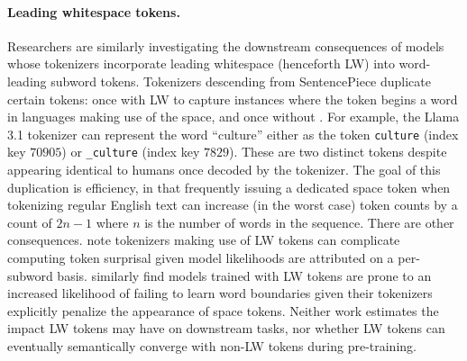 \paragraph{Leading whitespace tokens.}
Researchers are similarly investigating the downstream consequences of models whose tokenizers incorporate leading whitespace (henceforth LW) into word-leading subword tokens.
Tokenizers descending from SentencePiece duplicate certain tokens: once with LW to capture instances where the token begins a word in languages making use of the space, and once without \citep{Kudo_Richardson_2018}.
For example, the Llama 3.1 tokenizer can represent the word ``culture'' either as the token \verb.culture. (index key $70905$) or \verb._culture. (index key $7829$).
These are two distinct tokens despite appearing identical to humans once decoded by the tokenizer.
The goal of this duplication is efficiency, in that frequently issuing a dedicated space token when tokenizing regular English text can increase (in the worst case) token counts by a count of $2n-1$ where $n$ is the number of words in the sequence.
There are other consequences. \citet{Pimentel_Meister_2024} note tokenizers making use of LW tokens can complicate computing token surprisal given model likelihoods are attributed on a per-subword basis.
\citet{Oh_Schuler_2024} similarly find models trained with LW tokens are prone to an increased likelihood of failing to learn word boundaries given their tokenizers explicitly penalize the appearance of space tokens.
Neither work estimates the impact LW tokens may have on downstream tasks, nor whether LW tokens can eventually semantically converge with non-LW tokens during pre-training.